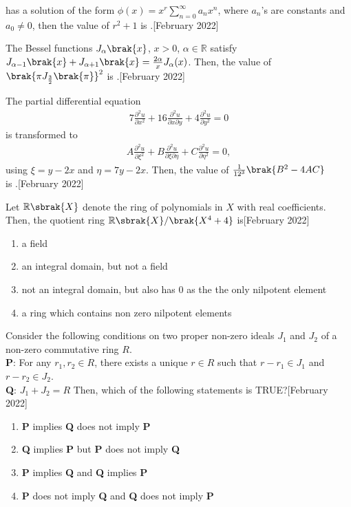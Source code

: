 has a solution of the form 
$\phi(x) = x^r \sum_{n=0}^{\infty} a_n x^n$,
where $a_n$'s are constants and $a_0 \neq 0$, then the value of $r^2 + 1$ is \underline{\hspace{2cm}}.\hfill[February 2022] 
\item The Bessel functions $J_\alpha\brak{x}$, $x > 0$, $\alpha \in \mathbb{R}$ satisfy
$J_{\alpha-1}\brak{x} + J_{\alpha+1}\brak{x} = \frac{2 \alpha}{x} J_{\alpha}(x)$.
Then, the value of $\brak{\pi J_{\frac{3}{2}}\brak{\pi}}^2$ is \underline{\hspace{2cm}}.\hfill[February 2022] 
\item The partial differential equation
\begin{align}
7 \frac{\partial^2 u}{\partial x^2} + 16 \frac{\partial^2 u}{\partial x \partial y} + 4 \frac{\partial^2 u}{\partial y^2} = 0
\end{align}
is transformed to
\begin{align}
A \frac{\partial^2 u}{\partial \xi^2} + B \frac{\partial^2 u}{\partial \xi \partial \eta} + C \frac{\partial^2 u}{\partial \eta^2} = 0,
\end{align}
using $\xi = y - 2x$ and $\eta = 7y - 2x$.
Then, the value of $\frac{1}{{12}^3} \brak{B^2 - 4AC}$ \\is \underline{\hspace{2cm}}.\hfill[February 2022]
\item Let $\mathbb{R}\sbrak{X}$ denote the ring of polynomials in $X$ with real coefficients. Then, the quotient ring $\mathbb{R}\sbrak{X}/\brak{X^4 + 4}$ is\hfill[February 2022]
\begin{enumerate}
    \item a field
    \item an integral domain, but not a field
    \item not an integral domain, but also has $0$ as the the only nilpotent element
    \item a ring which contains non zero nilpotent elements
\end{enumerate}
\item Consider the following conditions on two proper non-zero ideals $J_1$ and $J_2$ of a non-zero commutative ring $R$.
\\\textbf{P}: For any $r_1, r_2 \in R$, there exists a unique $r \in R$ such that $r - r_1 \in J_1$ and $r - r_2 \in J_2$.
\\\textbf{Q}: $J_1 + J_2 = R$
Then, which of the following statements is TRUE?\hfill[February 2022]
\begin{enumerate}
    \item \textbf{P} implies \textbf{Q} does not imply \textbf{P}
    \item \textbf{Q} implies \textbf{P} but \textbf{P} does not imply \textbf{Q}
    \item \textbf{P} implies \textbf{Q} and \textbf{Q} implies \textbf{P}
    \item \textbf{P} does not imply \textbf{Q} and \textbf{Q} does not imply \textbf{P}
\end{enumerate}
